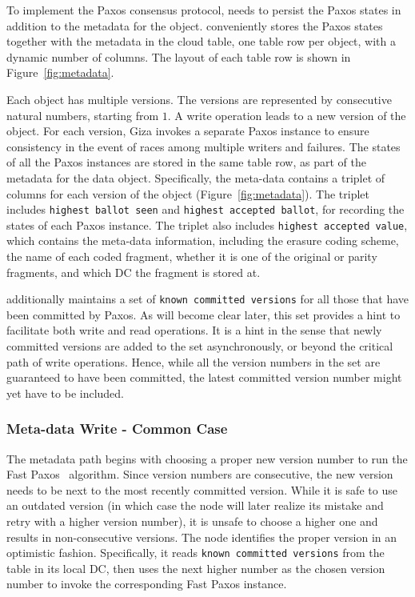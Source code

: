 To implement the Paxos consensus protocol,
\name needs to persist the Paxos states in addition to the metadata for the object.
{\name} conveniently stores the Paxos states together with the metadata in the cloud table,
one table row per object, with a dynamic number of columns. The layout of each table row is
shown in Figure~\ref{fig:metadata}.

Each object has multiple versions.
The versions are represented by consecutive natural numbers, starting from $1$.
A \name write operation leads to a new version of the object.
For each version, Giza invokes a separate Paxos instance to ensure consistency
in the event of races among multiple writers and failures.
The states of all the Paxos instances are stored in the same table row,
as part of the metadata for the data object.
Specifically, the meta-data contains a triplet of columns for each version of the object
(Figure~\ref{fig:metadata}).
The triplet includes {\tt highest ballot seen} and {\tt highest accepted ballot},
for recording the states of each Paxos instance.
The triplet also includes {\tt highest accepted value},
which contains the meta-data information, including the erasure coding scheme,
the name of each coded fragment, whether it is one of the original or parity fragments,
and which DC the fragment is stored at.

{\name} additionally maintains a set of {\tt known committed versions} 
for all those that have been committed by Paxos. As will become clear later,
this set provides a hint to facilitate both write and read operations.
It is a hint in the sense that newly committed versions are added to the set asynchronously,
or beyond the critical path of write operations.
Hence, while all the version numbers in the set are guaranteed to have been committed,
the latest committed version number might yet have to be included.

\subsubsection{Meta-data Write - Common Case}

The metadata path begins with choosing a proper new version number to run the Fast Paxos~\cite{fastpaxos} algorithm.
Since version numbers are consecutive, the new version needs to be next to the most recently committed version.
While it is safe to use an outdated version
(in which case the {\name} node will later realize its mistake and retry with a higher version number),
it is unsafe to choose a higher one and results in non-consecutive versions.
The {\name} node identifies the proper version in an optimistic fashion.
Specifically, it reads {\tt known committed versions} from the table in its local DC,
then uses the next higher number as the chosen version number to invoke the corresponding Fast Paxos instance.


